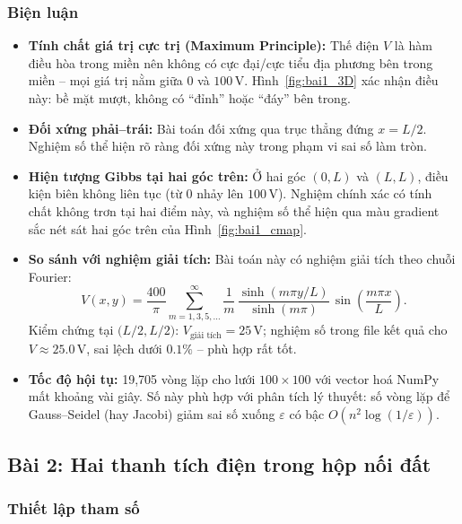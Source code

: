 \documentclass[12pt,a4paper]{article}
\begin{document}
\subsubsection{Biện luận}

\begin{itemize}
    \item \textbf{Tính chất giá trị cực trị (Maximum Principle):} Thế điện $V$ là hàm điều hòa trong miền nên không có cực đại/cực tiểu địa phương bên trong miền -- mọi giá trị nằm giữa $0$ và $100\,\mathrm{V}$. Hình~\ref{fig:bai1_3D} xác nhận điều này: bề mặt mượt, không có ``đỉnh'' hoặc ``đáy'' bên trong.

    \item \textbf{Đối xứng phải--trái:} Bài toán đối xứng qua trục thẳng đứng $x = L/2$. Nghiệm số thể hiện rõ ràng đối xứng này trong phạm vi sai số làm tròn.

    \item \textbf{Hiện tượng Gibbs tại hai góc trên:} Ở hai góc $(0, L)$ và $(L, L)$, điều kiện biên không liên tục (từ $0$ nhảy lên $100\,\mathrm{V}$). Nghiệm chính xác có tính chất không trơn tại hai điểm này, và nghiệm số thể hiện qua màu gradient sắc nét sát hai góc trên của Hình~\ref{fig:bai1_cmap}.

    \item \textbf{So sánh với nghiệm giải tích:} Bài toán này có nghiệm giải tích theo chuỗi Fourier:
    \[
        V(x,y) = \frac{400}{\pi} \sum_{m=1,3,5,\ldots}^{\infty} \frac{1}{m}\,\frac{\sinh(m\pi y/L)}{\sinh(m\pi)}\,\sin\!\left(\frac{m\pi x}{L}\right).
    \]
    Kiểm chứng tại $\bigl(L/2, L/2\bigr)$: $V_{\text{giải tích}} = 25\,\mathrm{V}$; nghiệm số trong file kết quả cho $V \approx 25.0\,\mathrm{V}$, sai lệch dưới $0.1\%$ -- phù hợp rất tốt.

    \item \textbf{Tốc độ hội tụ:} 19{,}705 vòng lặp cho lưới $100\times 100$ với vector hoá NumPy mất khoảng vài giây. Số này phù hợp với phân tích lý thuyết: số vòng lặp để Gauss--Seidel (hay Jacobi) giảm sai số xuống $\varepsilon$ có bậc $O(n^2 \log(1/\varepsilon))$.
\end{itemize}

\subsection{Bài 2: Hai thanh tích điện trong hộp nối đất}

\subsubsection{Thiết lập tham số}
\end{document}
